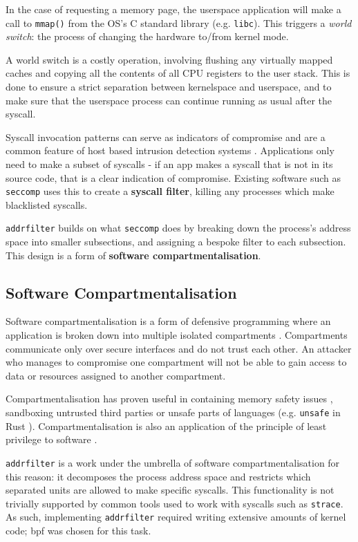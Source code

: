 In the case of requesting a memory page, the userspace application will make a
call to \texttt{mmap()} from the \ac{OS}'s C standard library (e.g. \texttt{libc}).
This triggers a \textit{world switch}: the process of changing the hardware
to/from kernel mode.

A world switch is a costly operation, involving flushing any virtually mapped
caches and copying all the contents of all \ac{CPU} registers to the user stack. This
is done to ensure a strict separation between kernelspace and userspace, and to
make sure that the userspace process can continue running as usual after the
syscall.

Syscall invocation patterns can serve as indicators of compromise
and are a common feature of host based intrusion detection systems \cite{10.1145/3214304}. 
Applications only need to make a subset of syscalls
- if an app makes a syscall that is not in its source code, that is a clear
indication of compromise. Existing software such as \texttt{seccomp} uses this
to create a \textbf{syscall filter}, killing any processes which make
blacklisted syscalls. 

\texttt{addrfilter} builds on what \texttt{seccomp} does by breaking down the
process's address space into smaller subsections, and assigning a bespoke filter
to each subsection. This design is a form of \textbf{software
compartmentalisation}. 

\subsection{Software Compartmentalisation}

Software compartmentalisation is a form of defensive programming where an
application is broken down into multiple isolated compartments \cite{SOK}. Compartments
communicate only over secure interfaces and do not trust each other. An attacker
who manages to compromise one compartment will not be able to gain access to
data or resources assigned to another compartment. 

Compartmentalisation has proven useful in containing memory safety issues
\cite{CONFFUZZ},
sandboxing untrusted third parties \cite{ANDROID_SOK} or unsafe parts of
languages \cite{MPK} (e.g.
\texttt{unsafe} in Rust \cite{rustbook_unsafe}). Compartmentalisation is also an
application of the principle of least privilege to software \cite{PRIVMAN}.

\texttt{addrfilter} is a work under the umbrella of software
compartmentalisation for this reason: it decomposes the process address space
and restricts which separated units are allowed to make specific syscalls.
This functionality is not trivially supported by common tools used to work with
syscalls such as \texttt{strace}. As such, implementing \texttt{addrfilter}
required writing extensive amounts of kernel code; \ac{bpf} was chosen for this
task.

